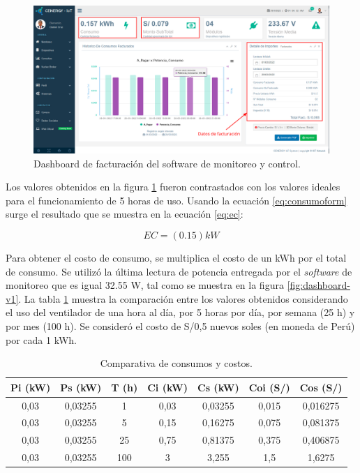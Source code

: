\begin{landscape} %
\begin{figure}[htpb]
\centering 
\includegraphics[width=1.7\textwidth]{./Figures/test/consumo/consumo.png}
\caption{Dashboard de facturación del software de monitoreo y control.}
\label{fig:dashboard-consumo}
\end{figure}
\end{landscape} %

Los valores obtenidos en la figura \ref{fig:dashboard-consumo} fueron contrastados con los valores ideales para el funcionamiento de 5 horas de uso. Usando la ecuación \ref{eq:consumoform} surge el resultado que se muestra en la ecuación \ref{eq:ec}:

\begin{equation}
	\label{eq:ec}
	EC = \left( 0.15 \right) kW
\end{equation}


Para obtener el costo de consumo, se multiplica el costo de un kWh por el total de consumo. Se utilizó la última lectura de potencia entregada por el \emph{software} de monitoreo que es igual 32.55 W, tal como se muestra en la figura \ref{fig:dashboard-v1}. La tabla \ref{tab:tablacostos} muestra la comparación entre los valores obtenidos considerando el uso del ventilador de una hora al día, por 5 horas por día, por semana (25 h) y por mes (100 h). Se consideró el costo de S/0,5 nuevos soles (en moneda de Perú) por cada 1 kWh.

\begin{table}[h]
	\centering
	\caption[Comparativa de consumos y costos]{Comparativa de consumos y costos.}
	\begin{tabular}{c c c c c c c}    
		\toprule
		\textbf{Pi (kW)} 	 & \textbf{Ps (kW)}  & \textbf{T (h)} &\textbf{Ci (kW)} &\textbf{Cs (kW)} &\textbf{Coi (S/)} &\textbf{Cos (S/)}\\
		\midrule
		0,03 & 0,03255 & 1 & 0,03 & 0,03255 & 0,015 & 0,016275\\		
		0,03 & 0,03255 & 5 & 0,15 & 0,16275 & 0,075 & 0,081375 \\
		0,03 & 0,03255 & 25 & 0,75 & 0,81375 & 0,375 & 0,406875\\		
		0,03 & 0,03255 & 100 & 3 & 3,255 & 1,5 & 1,6275\\		
		
		\bottomrule
		\hline
	\end{tabular}
	\label{tab:tablacostos}
\end{table}

